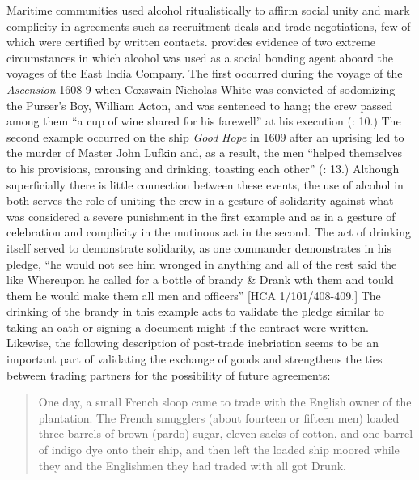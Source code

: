   Maritime communities used alcohol ritualistically to affirm social unity and mark complicity in agreements such as recruitment deals and trade negotiations, few of which were certified by written contacts. \citet{Fury2015} provides evidence of two extreme circumstances in which alcohol was used as a social bonding agent aboard the voyages of the East India Company. The first occurred during the voyage of the \textit{Ascension} 1608-9 when Coxswain Nicholas White was convicted of sodomizing the Purser’s Boy, William Acton, and was sentenced to hang; the crew passed among them “a cup of wine shared for his farewell” at his execution (\citealt{Fury2015}: 10.) The second example occurred on the ship \textit{Good} \textit{Hope} in 1609 after an uprising led to the murder of Master John Lufkin and, as a result, the men “helped themselves to his provisions, carousing and drinking, toasting each other” (\citealt{Fury2015}: 13.) Although superficially there is little connection between these events, the use of alcohol in both serves the role of uniting the crew in a gesture of solidarity against what was considered a severe punishment in the first example and as in a gesture of celebration and complicity in the mutinous act in the second. The act of drinking itself served to demonstrate solidarity, as one commander demonstrates in his pledge, “he would not see him wronged in anything and all of the rest said the like Whereupon he called for a bottle of brandy \& Drank wth them and tould them he would make them all men and officers” [HCA 1/101/408-409.] The drinking of the brandy in this example acts to validate the pledge similar to taking an oath or signing a document might if the contract were written. Likewise, the following description of post-trade inebriation seems to be an important part of validating the exchange of goods and strengthens the ties between trading partners for the possibility of future agreements:

\begin{quotation}
One day, a small French sloop came to trade with the English owner of the plantation.  The French smugglers (about fourteen or fifteen men) loaded three barrels of brown (pardo) sugar, eleven sacks of cotton, and one barrel of indigo dye onto their ship, and then left the loaded ship moored while they and the Englishmen they had traded with all got Drunk. \citep[15]{Hatfield2016} \end{quotation}

